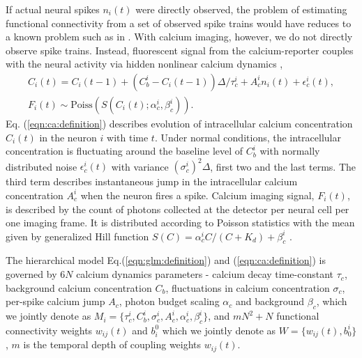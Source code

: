 \documentclass[amsmath,amssymb]{revtex4}
\begin{document}
If actual neural spikes $n_i(t)$ were directly observed, the problem of estimating functional connectivity from a set of observed spike trains would have reduces to a known problem such as in \cite{PILL07}. With calcium imaging, however, we do not directly observe spike trains. Instead, fluorescent signal from the calcium-reporter couples with the neural activity via hidden nonlinear calcium dynamics \cite{Vogelstein2009},
\begin{equation}\label{eqn:ca:definition}
\begin{array}{l}
C_i(t) = C_i(t-1) + (C^i_b-C_i(t-1)) \Delta/\tau^i_c + A^i_c n_i(t)+\epsilon_c^i(t), \\
F_i(t) \sim \text{Poiss}( S(C_i(t);\alpha^i_c,\beta^i_c) ).
\end{array}
\end{equation}
Eq. (\ref{eqn:ca:definition}) describes evolution of intracellular calcium concentration $C_i(t)$ in the neuron $i$ with time $t$. Under normal conditions, the intracellular concentration is fluctuating around the baseline level of $C^i_b$ with normally distributed noise $\epsilon^i_c(t)$ with variance $(\sigma^i_c)^2\Delta$, first two and the last terms.
The third term describes instantaneous jump in the intracellular calcium concentration $A^i_c$ when the neuron fires a spike.
Calcium imaging signal, $F_i(t)$, is described by the count of photons collected at the detector per neural cell per one imaging frame. It is distributed according to Poisson statistics with the mean given by generalized Hill function $S(C)=\alpha^i_c C/(C+K_d) + \beta^i_c$ \cite{Yasuda2004}.

The hierarchical model Eq.(\ref{eqn:glm:definition}) and (\ref{eqn:ca:definition}) is governed by $6N$ calcium dynamics parameters - calcium decay time-constant $\tau_c$, background calcium concentration $C_{b}$, fluctuations in calcium concentration $\sigma_c$, per-spike calcium jump $A_c$, photon budget scaling $\alpha_c$ and background $\beta_c$, which we jointly denote as $M_i=\{\tau^i_c, C^i_{b}, \sigma^i_c, A^i_c, \alpha^i_c, \beta^i_c\}$, and $m N^2 + N$ functional connectivity weights $w_{ij}(t)$ and $b^0_i$ which we jointly denote as $W=\{w_{ij}(t),b_0^i\}$, $m$ is the temporal depth of coupling weights $w_{ij}(t)$.
\end{document}
